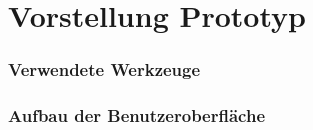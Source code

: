 \section{Vorstellung Prototyp}
\subsubsection{Verwendete Werkzeuge}
\subsubsection{Aufbau der Benutzeroberfläche}